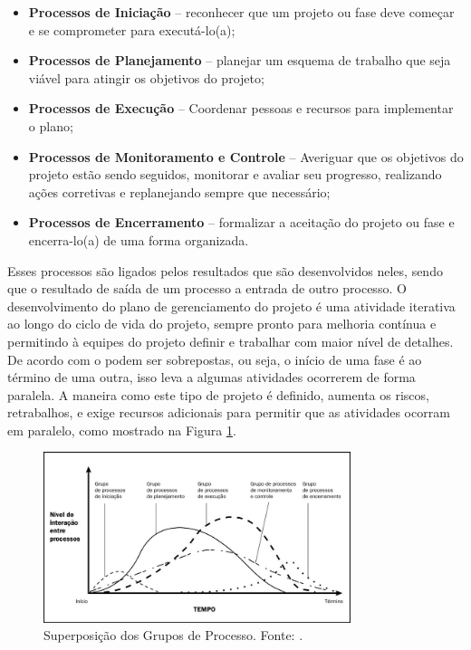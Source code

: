 \begin{itemize}
	\item \textbf{Processos de Iniciação} – reconhecer que um projeto ou fase deve começar e se comprometer para executá-lo(a);
	\item \textbf{Processos de Planejamento} – planejar um esquema de trabalho que seja viável para atingir os objetivos do projeto;
	\item \textbf{Processos de Execução} – Coordenar pessoas e recursos para implementar o plano;
	\item \textbf{Processos de Monitoramento e Controle} – Averiguar que os objetivos do projeto estão sendo seguidos, monitorar e avaliar seu progresso, realizando ações corretivas e replanejando sempre que necessário; 
	\item \textbf{Processos de Encerramento} – formalizar a aceitação do projeto ou
	fase e encerra-lo(a) de uma forma organizada.
\end{itemize}

Esses processos são ligados pelos resultados que são desenvolvidos neles, sendo que o resultado de saída de um processo a entrada de outro processo. O desenvolvimento do plano de gerenciamento do projeto é uma atividade iterativa ao longo do ciclo de vida do projeto, sempre pronto para melhoria contínua e permitindo à equipes do projeto definir e trabalhar com maior nível de detalhes. De acordo com o \cite{pmbok} podem ser sobrepostas, ou seja, o início de uma fase é ao término de uma outra, isso leva a algumas atividades ocorrerem de forma paralela. A maneira como este tipo de projeto  é definido, aumenta os riscos, retrabalhos, e exige recursos adicionais para permitir que as atividades ocorram em paralelo, como mostrado na Figura \ref{img:fases_sobrepostas}.

\begin{figure}[H]
	\centering
	\includegraphics[width=0.8\textwidth]{figuras/fases_pmbok_sobrepostas.jpg}
	\caption{Superposição dos Grupos de Processo. Fonte: \cite{fases_sobrepostas_pmbok}.}
	\label{img:fases_sobrepostas}
\end{figure}

